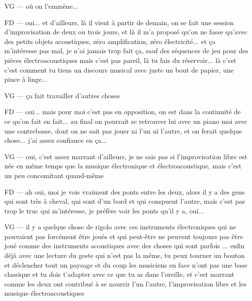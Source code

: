 VG — où on l'emmène... 

FD — oui... et d'ailleurs, là il vient à partir de demain, on se fait une session d'improvisation de deux ou trois jours, et là il m'a proposé qu'on ne fasse qu'avec des petits objets acoustiques, zéro amplification, zéro électricité... et ça m'intéresse pas mal, je n'ai jamais trop fait ça, sauf des séquences de jeu pour des pièces électroacoustiques mais c'est pas pareil, là tu fais du réservoir... là c'est c'est comment tu tiens un discours musical avec juste un bout de papier, une pince à linge... 

VG — ça fait travailler d'autres choses 

FD — oui... mais pour moi c'est pas en opposition, on est dans la continuité de ce qu'on fait en fait... au final on pourrait se retrouver lui avec un piano moi avec une contrebasse, dont on ne sait pas jouer ni l'un ni l'autre, et on ferait quelque chose... j'ai assez confiance en ça... 

VG — oui, c'est assez marrant d'ailleurs, je ne sais pas si l'improvisation libre est née en même temps que la musique électronique et électroacoustique, mais c'est un peu concomitant quand-même 

FD — ah oui, moi je vois vraiment des ponts entre les deux, alors il y a des gens qui sont très à cheval, qui sont d'un bord et qui conspuent l'autre, mais c'est pas trop le truc qui m'intéresse, je préfère voir les ponts qu'il y a, oui... 

VG — il y a quelque chose de rigolo avec ces instruments électroniques qui ne pouvaient pas forcément être joués et qui peut-être ne peuvent toujours pas être joué comme des instruments acoustiques avec des choses qui sont parfois ... enfin déjà avec une lecture du geste qui n'est pas la même, tu peux tourner un bouton et déclencher tout un paysage et du coup les musiciens en face n'ont pas une base classique et tu dois t'adapter avec ce que tu as dans l'oreille, et c'est marrant comme les deux ont contribué à se nourrir l'un l'autre, l'improvisation libre et les musique électroacoustiques 


